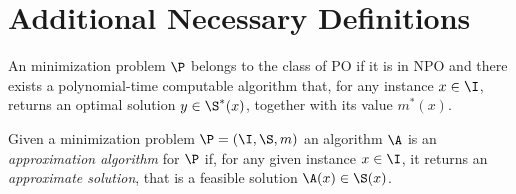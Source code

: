 \section{Additional Necessary Definitions} \label{sec:additonaldef}



\begin{definition} An minimization problem $\P$ belongs to the class of PO if it is in NPO and there exists a polynomial-time computable algorithm that, for any instance $x\in\I$, returns an optimal solution $y\in\S^*(x)$, together with its value $m^*(x)$.
\end{definition}

\begin{definition}Given a minimization problem $\P = (\I,\S,m)$ an algorithm $\A$ is an {\em approximation algorithm} for $\P$ if, for any given instance $x\in\I$, it returns an {\em approximate solution}, that is a feasible solution $\A(x) \in \S(x)$.
\end{definition}


